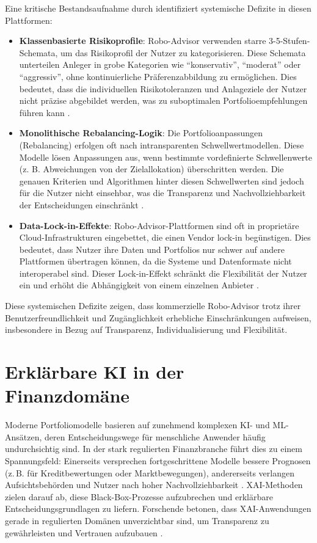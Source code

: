     Eine kritische Bestandsaufnahme durch \textcite{hecker2017} identifiziert systemische Defizite in diesen Plattformen:
    \begin{itemize}
    \item \textbf{Klassenbasierte Risikoprofile}: Robo-Advisor verwenden starre 3-5-Stufen-Schemata, um das Risikoprofil der Nutzer zu kategorisieren.
    Diese Schemata unterteilen Anleger in grobe Kategorien wie \enquote{konservativ}, \enquote{moderat} oder \enquote{aggressiv}, ohne kontinuierliche Präferenzabbildung zu ermöglichen.
    Dies bedeutet, dass die individuellen Risikotoleranzen und Anlageziele der Nutzer nicht präzise abgebildet werden, was zu suboptimalen Portfolioempfehlungen führen kann \autocite[S. 32]{hecker2017}.

    \item \textbf{Monolithische Rebalancing-Logik}: Die Portfolioanpassungen (Rebalancing) erfolgen oft nach intransparenten Schwellwertmodellen.
    Diese Modelle lösen Anpassungen aus, wenn bestimmte vordefinierte Schwellenwerte (z. B. Abweichungen von der Zielallokation) überschritten werden.
    Die genauen Kriterien und Algorithmen hinter diesen Schwellwerten sind jedoch für die Nutzer nicht einsehbar, was die Transparenz und Nachvollziehbarkeit der Entscheidungen einschränkt \autocite[S. 33]{hecker2017}.

    \item \textbf{Data-Lock-in-Effekte}: Robo-Advisor-Plattformen sind oft in proprietäre Cloud-Infrastrukturen eingebettet, die einen Vendor lock-in begünstigen.
    Dies bedeutet, dass Nutzer ihre Daten und Portfolios nur schwer auf andere Plattformen übertragen können, da die Systeme und Datenformate nicht interoperabel sind.
    Dieser Lock-in-Effekt schränkt die Flexibilität der Nutzer ein und erhöht die Abhängigkeit von einem einzelnen Anbieter \autocite[S. 33 und 34]{hecker2017}.
    \end{itemize}

    Diese systemischen Defizite zeigen, dass kommerzielle Robo-Advisor trotz ihrer Benutzerfreundlichkeit und Zugänglichkeit erhebliche Einschränkungen aufweisen, insbesondere in Bezug auf Transparenz, Individualisierung und Flexibilität.


\section{Erklärbare KI in der Finanzdomäne}

  Moderne Portfoliomodelle basieren auf zunehmend komplexen \acs{KI}- und \acs{ML}-Ansätzen, deren Entscheidungswege für menschliche Anwender häufig undurchsichtig sind.
  In der stark regulierten Finanzbranche führt dies zu einem Spannungsfeld:
  Einerseits versprechen fortgeschrittene Modelle bessere Prognosen (z.\,B. für Kreditbewertungen oder Marktbewegungen), andererseits verlangen Aufsichtsbehörden und Nutzer nach hoher Nachvollziehbarkeit \autocite[S. 867 und 868]{Weber2024}.
  \acs{XAI}-Methoden zielen darauf ab, diese Black-Box-Prozesse aufzubrechen und erklärbare Entscheidungsgrundlagen zu liefern.
  Forschende betonen, dass \acs{XAI}-Anwendungen gerade in regulierten Domänen unverzichtbar sind, um Transparenz zu gewährleisten und Vertrauen aufzubauen \autocite[S. 1-3]{Yeo2025}.

